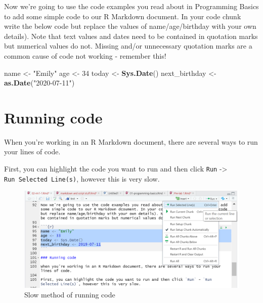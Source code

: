 \documentclass[]{book}
\newenvironment{Shaded}{\begin{snugshade}}{\end{snugshade}}
\newcommand{\DecValTok}[1]{\textcolor[rgb]{0.00,0.00,0.81}{#1}}
\newcommand{\KeywordTok}[1]{\textcolor[rgb]{0.13,0.29,0.53}{\textbf{#1}}}
\newcommand{\NormalTok}[1]{#1}
\newcommand{\StringTok}[1]{\textcolor[rgb]{0.31,0.60,0.02}{#1}}
\begin{document}
Now we're going to use the code examples you read about in Programming Basics to add some simple code to our R Markdown document. In your code chunk write the below code but replace the values of name/age/birthday with your own details). Note that text values and dates need to be contained in quotation marks but numerical values do not. Missing and/or unnecessary quotation marks are a common cause of code not working - remember this!

\begin{Shaded}
\begin{Highlighting}[]
\NormalTok{name <-}\StringTok{ "Emily"} 
\NormalTok{age <-}\StringTok{ }\DecValTok{34}
\NormalTok{today <-}\StringTok{ }\KeywordTok{Sys.Date}\NormalTok{()}
\NormalTok{next_birthday <-}\StringTok{ }\KeywordTok{as.Date}\NormalTok{(}\StringTok{"2020-07-11"}\NormalTok{)}
\end{Highlighting}
\end{Shaded}

\hypertarget{running-code}{%
\section{Running code}\label{running-code}}

When you're working in an R Markdown document, there are several ways to run your lines of code.

First, you can highlight the code you want to run and then click \texttt{Run} -\textgreater{} \texttt{Run\ Selected\ Line(s)}, however this is very slow.

\begin{figure}

{\centering \includegraphics[width=1\linewidth]{images/run1} 

}

\caption{Slow method of running code}\label{fig:img-run1}
\end{figure}
\end{document}
